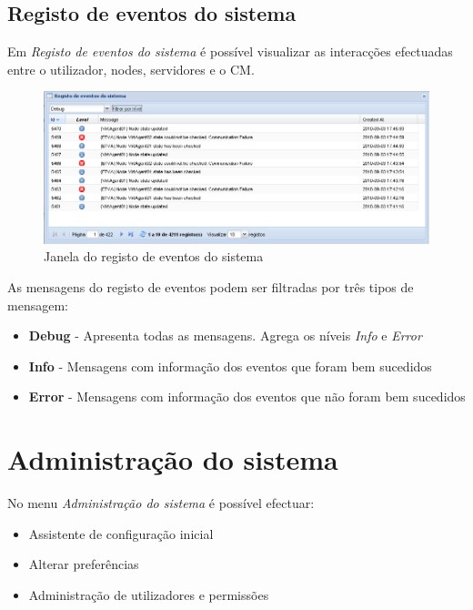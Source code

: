 \subsection{Registo de eventos do sistema}
\label{sec:system_event_reg}

Em \emph{Registo de eventos do sistema} é possível visualizar as interacções efectuadas entre o utilizador, nodes, servidores e o CM.

\begin{figure}[H]
	\begin{center}
	\includegraphics[scale=0.5]{screenshots/events_log.png}
	\caption{Janela do registo de eventos do sistema}
	\label{fig:events_log}
	\end{center}
\end{figure}

As mensagens do registo de eventos podem ser filtradas por três tipos de mensagem:
\begin{itemize}
    \item {\bf Debug} - Apresenta todas as mensagens. Agrega os níveis \emph{Info} e \emph{Error}
    \item {\bf Info} - Mensagens com informação dos eventos que foram bem sucedidos
    \item {\bf Error} - Mensagens com informação dos eventos que não foram bem sucedidos
\end{itemize}

\section{Administração do sistema}
\label{sec:first_time_wizard}
No menu \emph{Administração do sistema} é possível efectuar:
\begin{itemize}
\item Assistente de configuração inicial
\item Alterar preferências
\item Administração de utilizadores e permissões
\end{itemize}


